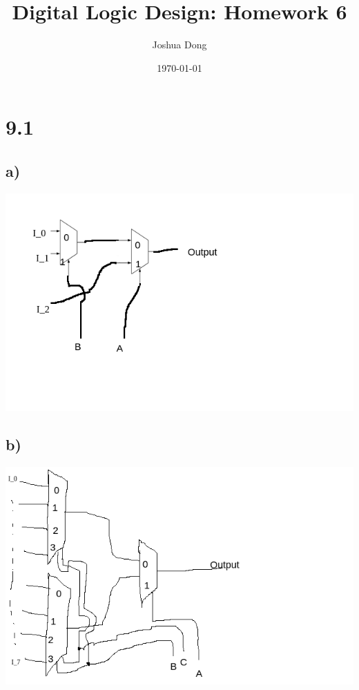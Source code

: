 \documentclass{article}
\begin{document}
\title{Digital Logic Design: Homework 6}
\author{Joshua Dong}
\date{\today}
\maketitle

\section{9.1}
\subsection{a)}
\includegraphics[scale=0.4]{23}
\subsection{b)}
\includegraphics[scale=0.4]{4428}
\end{document}
